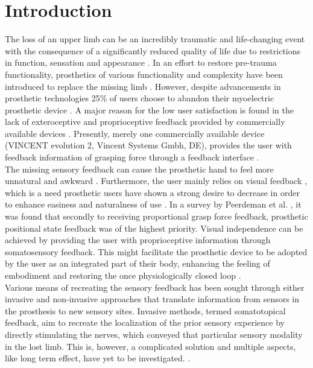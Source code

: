 \chapter{Introduction}

The loss of an upper limb can be an incredibly traumatic and life-changing event with the consequence of a significantly reduced quality of life due to restrictions in function, sensation and appearance \cite{Schofield2014,Ostlie2011}. 
In an effort to restore pre-trauma functionality, prosthetics of various functionality and complexity have been introduced to replace the missing limb \cite{Geethanjali2016}. However, despite advancements in prosthetic technologies 25\% of users choose to abandon their myoelectric prosthetic device \cite{Biddiss2007a}. A major reason for the low user satisfaction is found in the lack of exteroceptive and proprioceptive feedback provided by commercially available devices \cite{Schofield2014,Peerdeman2011}. Presently, merely one commercially available device (VINCENT evolution 2, Vincent Systems Gmbh, DE), provides the user with feedback information of grasping force through a feedback interface \cite{Systems2005}. \\    
%
The missing sensory feedback can cause the prosthetic hand to feel more unnatural and awkward \cite{Pamungkas2015}. Furthermore, the user mainly relies on visual feedback \cite{Pamungkas2015,Stephens-Fripp2018}, which is a need prosthetic users have shown a strong desire to decrease in order to enhance easiness and naturalness of use \cite{Atkins1996}.
In a survey by Peerdeman et al. \cite{Peerdeman2011}, it was found that secondly to receiving proportional grasp force feedback, prosthetic positional state feedback was of the highest priority. Visual independence can be achieved by providing the user with proprioceptive information through somatosensory feedback. This might facilitate the prosthetic device to be adopted by the user as an integrated part of their body, enhancing the feeling of embodiment and restoring the once physiologically closed loop \cite{Stephens-Fripp2018,Xu2016,Strbac2016,Geng2012}. \\
%
Various means of recreating the sensory feedback has been sought through either invasive and non-invasive approaches that translate information from sensors in the prosthesis to new sensory sites. Invasive methods, termed somatotopical feedback, aim to recreate the localization of the prior sensory experience by directly stimulating the nerves, which conveyed that particular sensory modality in the lost limb. This is, however, a complicated solution and multiple aspects, like long term effect, have yet to be investigated. \cite{Schofield2014,Stephens-Fripp2018}. 
